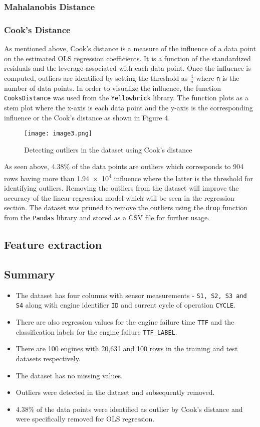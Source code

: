 \documentclass{article}
\begin{document}
\subsubsection{Mahalanobis Distance}
\subsubsection{Cook's Distance}
As mentioned above, Cook's distance is a measure of the influence of a data point on the estimated OLS regression coefficients.
It is a function of the standardized residuals and the leverage associated with each data point. Once the influence is computed, outliers are identified by setting the threshold as \(\frac{4}{n}\) where \texttt{n} is the number of data points. 
In order to visualize the influence, the function \texttt{CooksDistance} was used from the \texttt{Yellowbrick} library. The function plots as a stem plot where the x-axis is each data point and the y-axis is the corresponding influence or the Cook's distance as shown in Figure 4.
\begin{figure}[h]
	\centering
	\texttt{[image: image3.png]}
	\caption{Detecting outliers in the dataset using Cook's distance}
\end{figure}

As seen above, 4.38\% of the data points are outliers which corresponds to 904 rows having more than \num{1.94e4} influence where the latter is the threshold for identifying outliers. Removing the outliers from the dataset will improve the accuracy of the linear regression model which will be seen in the regression section.
The dataset was pruned to remove the outliers using the \texttt{drop} function from the \texttt{Pandas} library and stored as a CSV file for further usage.
\subsection{Feature extraction}
\subsection{Summary}
\begin{itemize}
	\item The dataset has four columns with sensor measurements - \texttt{S1, S2, S3 and S4} along with engine identifier \texttt{ID} and current cycle of operation \texttt{CYCLE}.
	\item There are also regression values for the engine failure time \texttt{TTF} and the classification labels for the engine failure \texttt{TTF\_LABEL}.
	\item There are 100 engines with 20,631 and 100 rows in the training and test datasets respectively. 
	\item The dataset has no missing values.
	\item Outliers were detected in the dataset and subsequently removed.
	\item 4.38\% of the data points were identified as outlier by Cook's distance and were specifically removed for OLS regression.
\end{itemize}
\newpage
\end{document}
